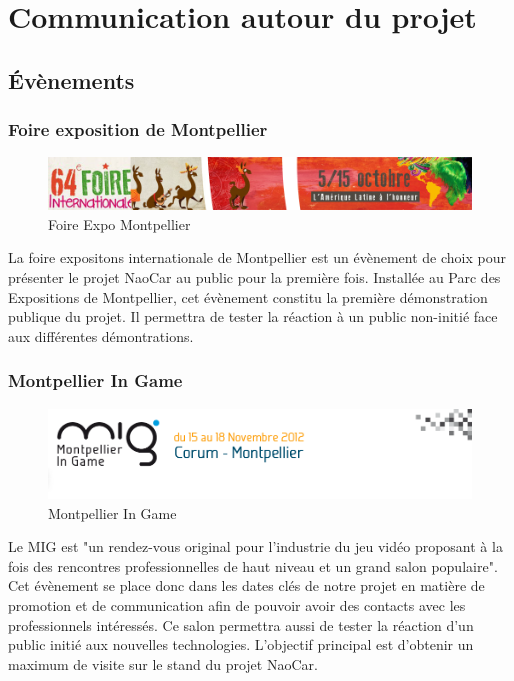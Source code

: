 \documentclass[11pt]{report} %
\begin{document}
	\section{Communication autour du projet}
		\subsection{Évènements}
			\subsubsection{Foire exposition de Montpellier}
				\begin{figure}[htb]
				\centering
				\includegraphics[width=1\textwidth]{foire-expo.png}
				\caption{Foire Expo Montpellier}
				\label{fig:Foire Expo Montpellier}
				\end{figure}
				La foire expositons internationale de Montpellier est un évènement de choix pour présenter le projet NaoCar au public pour la première fois.
				Installée au Parc des Expositions de Montpellier, cet évènement constitu la première démonstration publique du projet. Il permettra de tester la réaction à un public non-initié face aux différentes démontrations.
			\subsubsection{Montpellier In Game}
				\begin{figure}[htb]
				\centering
				\includegraphics[width=1\textwidth]{mig.png}
				\caption{Montpellier In Game}
				\label{fig:Montpellier In Game}
				\end{figure}
	                        Le MIG est "un rendez-vous original pour l’industrie du jeu vidéo proposant à la fois des rencontres professionnelles de haut niveau et un grand salon populaire". \\Cet évènement se place donc dans les dates clés de notre projet en matière de promotion et de communication afin de pouvoir avoir des contacts avec les professionnels intéressés. Ce salon permettra aussi de tester la réaction d'un public initié aux nouvelles technologies.
			L'objectif principal est d'obtenir un maximum de visite sur le stand du projet NaoCar.
		\newpage
\end{document}
